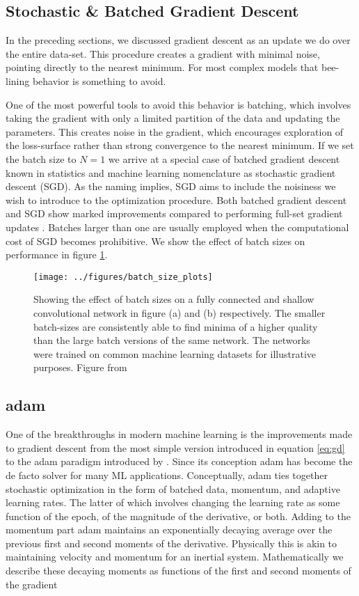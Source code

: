 \subsection{Stochastic \& Batched Gradient Descent}
In the preceding sections, we discussed gradient descent as an update we do over the entire data-set. This procedure creates a gradient with minimal noise, pointing directly to the nearest minimum. For most complex models that bee-lining behavior is something to avoid. 

One of the most powerful tools to avoid this behavior is batching, which involves taking the gradient with only a limited partition of the data and updating the parameters. This creates noise in the gradient, which encourages exploration of the loss-surface rather than strong convergence to the nearest minimum. If we set the batch size to $N=1$ we arrive at a special case of batched gradient descent known in statistics and machine learning nomenclature as stochastic gradient descent (SGD). As the naming implies, SGD aims to include the noisiness we wish to introduce to the optimization procedure. Both batched gradient descent and SGD show marked improvements compared to performing full-set gradient updates \cite{Keskar2016}. 
Batches larger than one are usually employed when the computational cost of SGD becomes prohibitive. We show the effect of batch sizes on performance in figure \ref{fig:batch_size}. 

\begin{figure}[ht]
\centering
\texttt{[image: ../figures/batch\_size\_plots]}
\caption[Effect of the batch size on performance]{Showing the effect of batch sizes on a fully connected and shallow convolutional network in figure (a) and (b) respectively. The smaller batch-sizes are consistently able to find minima of a higher quality than the large batch versions of the same network. The networks were trained on common machine learning datasets for illustrative purposes. Figure from \citet{Keskar2016} }\label{fig:batch_size}
\end{figure}

\subsection{adam}\label{sec:adam}
One of the breakthroughs in modern machine learning is the improvements made to gradient descent from the most simple version introduced in equation \ref{eq:gd} to the adam paradigm introduced by \citet{Kingma2015}. Since its conception adam has become the de facto solver for many ML applications. Conceptually, adam ties together stochastic optimization in the form of batched data, momentum, and adaptive learning rates. The latter of which involves changing the learning rate as some function of the epoch, of the magnitude of the derivative, or both. Adding to the momentum part adam maintains an exponentially decaying average over the previous first and second moments of the derivative. Physically this is akin to maintaining velocity and momentum for an inertial system. Mathematically we describe these decaying moments as functions of the first and second  moments of the gradient 

